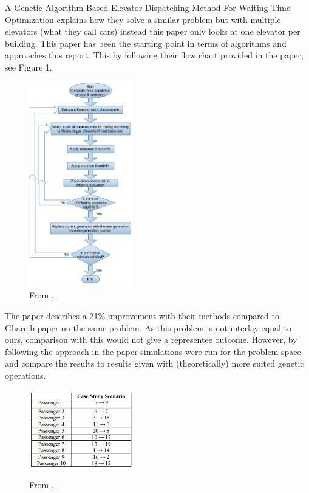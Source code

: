 
A Genetic Algorithm Based Elevator Dispatching Method For Waiting Time Optimization \cite{tartan2016genetic} explains how they solve a similar problem but with multiple elevators (what they call cars) instead this paper only looks at one elevator per building. This paper has been the starting point in terms of algorithms and approaches this report. This by following their flow chart provided in the paper, see Figure 1. 

\begin{figure}[ht]
\centering
\includegraphics[width=0.4\textwidth]{diagram_1.png}
\caption{From ..}
	\label{fig:Flow_1}
\end{figure}
The paper describes a 21\% improvement with their methods compared to Ghareib paper \cite{gharieb2005optimal} on the same problem. As this problem is not interlay equal to ours, comparison with this would not give a representee outcome. However, by following the approach in the paper simulations were run for the problem space and compare the results to results given with (theoretically) more suited genetic operations.
\newpage

\begin{figure}[ht]
\centering
\includegraphics[width=0.4\textwidth]{tabel_1.png}
	\label{fig:Tabel_1}
\caption{From ..}
\end{figure}


